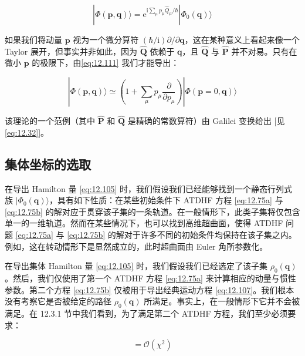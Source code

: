 \begin{equation}
|\Phi(\boldsymbol{p},\boldsymbol{q})\rangle=\mathrm{e}^{\mathrm{i}\sum_{\mu}p_{\mu}\hat{Q}_{\mu}/\hbar}|\Phi_{0}(\boldsymbol{q})\rangle\label{eq:12.112}
\end{equation}

如果我们将动量 $\boldsymbol{p}$ 视为一个微分算符 $(\hbar/\mathrm{i})\partial/\partial\boldsymbol{q}$，这在某种意义上看起来像一个
Taylor 展开，但事实并非如此，因为 $\hat{\boldsymbol{Q}}$ 依赖于 $\boldsymbol{q}$，且
$\hat{\boldsymbol{Q}}$ 与 $\hat{\boldsymbol{P}}$ 并不对易。只有在微小 $\boldsymbol{p}$
的极限下，由\ref{eq:12.111} 我们才能导出：

\begin{equation}
|\Phi(\boldsymbol{p},\boldsymbol{q})\rangle\simeq\left(1+\sum_{\mu}p_{\mu}\frac{\partial}{\partial p_{\mu}}\right)|\Phi(\boldsymbol{p}=0,\boldsymbol{q})\rangle\label{eq:12.113}
\end{equation}

该理论的一个范例（其中 $\hat{\boldsymbol{P}}$ 和 $\hat{\boldsymbol{Q}}$ 是精确的常数算符）由
Galilei 变换给出 {[}见\ref{eq:12.32}{]}。

\subsection{集体坐标的选取\label{subsec:12.3.4}}

在导出 Hamilton 量 \ref{eq:12.105} 时，我们假设我们已经能够找到一个静态行列式族 $|\Phi_{0}(\boldsymbol{q})\rangle$，具有如下性质：在某些初始条件下
ATDHF 方程 \ref{eq:12.75a} 与 \ref{eq:12.75b} 的解对应于贯穿该子集的一条轨道。在一般情形下，此类子集将仅包含单一的一维轨道。然而在某些情况下，也可以找到高维超曲面，使得
ATDHF 问题 \ref{eq:12.75a} 与 \ref{eq:12.75b} 的解对于许多不同的初始条件均保持在该子集之内。例如，这在转动情形下是显然成立的，此时超曲面由
Euler 角所参数化。

在导出集体 Hamilton 量 \ref{eq:12.105} 时，我们假设我们已经选定了该子集 $\rho_{0}(\boldsymbol{q})$。然后，我们仅使用了第一个
ATDHF 方程 \ref{eq:12.75a} 来计算相应的动量与惯性参数。第二个方程 \ref{eq:12.75b} 仅被用于导出经典运动方程
\ref{eq:12.107}。我们根本没有考察它是否被给定的路径 $\rho_{0}(\boldsymbol{q})$ 所满足。事实上，在一般情形下它并不会被满足。在
12.3.1 节中我们看到，为了满足第二个 ATDHF 方程，我们至少必须要求：

\begin{equation}
[h_{0}(\rho_{0}),\rho_{0}]=\mathcal{O}(\chi^{2})\label{eq:12.114}
\end{equation}

